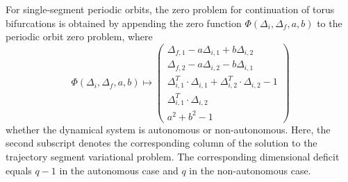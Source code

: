 For single-segment periodic orbits, the zero problem for continuation of torus bifurcations is obtained by appending the zero function $\Phi(\Delta_i,\Delta_f,a,b)$ to the periodic orbit zero problem, where
\begin{equation}
\Phi(\Delta_i,\Delta_f,a,b)\mapsto\left(\begin{array}{c}\Delta_{f,1}-a\Delta_{i,1}+b\Delta_{i,2}\\\Delta_{f,2}-a\Delta_{i,2}-b\Delta_{i,1}\\\Delta_{i,1}^T\cdot\Delta_{i,1}+\Delta_{i,2}^T\cdot\Delta_{i,2}-1\\\Delta_{i,1}^T\cdot\Delta_{i,2}\\a^2+b^2-1\end{array}\right)
\end{equation}
whether the dynamical system is autonomous or non-autonomous. Here, the second subscript denotes the corresponding column of the solution to the trajectory segment variational problem. The corresponding dimensional deficit equals $q-1$ in the autonomous case and $q$ in the non-autonomous case.

